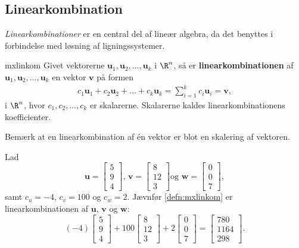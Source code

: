 \subsection{Linearkombination}
\textit{Linearkombinationer} er en central del af lineær algebra, da det benyttes i forbindelse med løsning af ligningssystemer. 
%
\begin{defn}{}{mxlinkom}
Givet vektorerne $\mathbf{u}_1, \mathbf{u}_2, \ldots, \mathbf{u}_k$ i $\R^n$, så er \textbf{linearkombinationen} af $\mathbf{u}_1, \mathbf{u}_2, \ldots, \mathbf{u}_k$ en vektor $\mathbf{v}$ på formen 
%
\begin{align*}
c_1\mathbf{u}_1+c_2\mathbf{u}_2+\ldots+c_k\mathbf{u}_k=\sum\limits_{i=1}^k c_i\mathbf{u}_i=\mathbf{v},
\end{align*}
%
i $\R^n$, hvor $c_1, c_2, \ldots, c_k$ er skalarerne.
Skalarerne kaldes linearkombinationens koefficienter.
%
\end{defn}
%
%
\noindent 
%
Bemærk at en linearkombination af én vektor er blot en skalering af vektoren.
\\
%
\begin{eks}
Lad 
$$
\textbf{u}=
\begin{bmatrix}
5 \\
9 \\
4
\end{bmatrix}
\text{, }
\textbf{v}=
\begin{bmatrix}
8  \\
12 \\ 
3
\end{bmatrix}
\text{og }
\textbf{w}=
\begin{bmatrix}
0 \\
0 \\
7
\end{bmatrix},
$$
samt $c_u=-4$, $c_v=100$ og $c_w=2$. 
Jævnfør \ref{defn:mxlinkom} er linearkombinationen af $\textbf{u}$, $\textbf{v}$ og $\textbf{w}$:
$$
(-4)
\begin{bmatrix}
5 \\ 
9 \\ 
4
\end{bmatrix}
+
100
\begin{bmatrix}
8 \\
12 \\ 
3
\end{bmatrix}
+
2
\begin{bmatrix}
0 \\
0 \\ 
7
\end{bmatrix}
=
\begin{bmatrix}
780 \\
1164 \\ 
298
\end{bmatrix}
\text{.}
$$
\end{eks}
